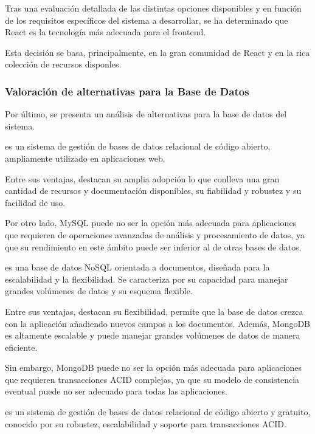 Tras una evaluación detallada de las distintas opciones disponibles y en función de los requisitos específicos del sistema a desarrollar, se ha determinado que React es la tecnología más adecuada para el frontend.

Esta decisión se basa, principalmente, en la gran comunidad de React y en la rica colección de recursos disponles.

\subsubsection{Valoración de alternativas para la Base de Datos}
Por último, se presenta un análisis de alternativas para la base de datos del sistema.

 es un sistema de gestión de bases de datos relacional de código abierto, ampliamente utilizado en aplicaciones web. 

Entre sus ventajas, destacan su amplia adopción lo que conlleva una gran cantidad de recursos y documentación disponibles, su fiabilidad y robustez y su facilidad de uso. 

Por otro lado, MySQL puede no ser la opción más adecuada para aplicaciones que requieren de operaciones avanzadas de análisis y procesamiento de datos, ya que su rendimiento en este ámbito puede ser inferior al de otras bases de datos.

 es una base de datos NoSQL orientada a documentos, diseñada para la escalabilidad y la flexibilidad. Se caracteriza por su capacidad para manejar grandes volúmenes de datos y su esquema flexible.

Entre sus ventajas, destacan su flexibilidad, permite que la base de datos crezca con la aplicación añadiendo nuevos campos a los documentos.
Además, MongoDB es altamente escalable y puede manejar grandes volúmenes de datos de manera eficiente.

Sin embargo, MongoDB puede no ser la opción más adecuada para aplicaciones que requieren transacciones ACID complejas, ya que su modelo de consistencia eventual puede no ser adecuado para todas las aplicaciones.

 es un sistema de gestión de bases de datos relacional de código abierto y gratuito, conocido por su robustez, escalabilidad y soporte para transacciones ACID.

